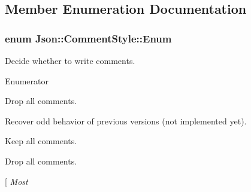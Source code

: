 \subsection{Member Enumeration Documentation}
\subsubsection[{Enum}]{\setlength{\rightskip}{0pt plus 5cm}enum {\bf Json\+::\+Comment\+Style\+::\+Enum}}\label{struct_json_1_1_comment_style_a51fc08f3518fd81eba12f340d19a3d0c}


Decide whether to write comments. 

\begin{Desc}
\item[Enumerator]\par
\begin{description}
\item[{\em 
None\label{struct_json_1_1_comment_style_a51fc08f3518fd81eba12f340d19a3d0ca36399eca8a3b9d995dd8ab0ecb6b5398}
}]Drop all comments. \item[{\em 
Most\label{struct_json_1_1_comment_style_a51fc08f3518fd81eba12f340d19a3d0ca0a9010dbb245e235801402fcc930e3ae}
}]Recover odd behavior of previous versions (not implemented yet). \item[{\em 
All\label{struct_json_1_1_comment_style_a51fc08f3518fd81eba12f340d19a3d0ca23cbf2619e7ca2201259b71212089d6b}
}]Keep all comments. \item[{\em 
None\label{struct_json_1_1_comment_style_a51fc08f3518fd81eba12f340d19a3d0ca36399eca8a3b9d995dd8ab0ecb6b5398}
}]Drop all comments. \item[{\em 
Most\label{struct_json_1_1_comment_style_a51fc08f3518fd81eba12f340d19a3d0ca0a9010dbb245e235801402fcc930e3ae}
}
\end{description}
\end{Desc}
